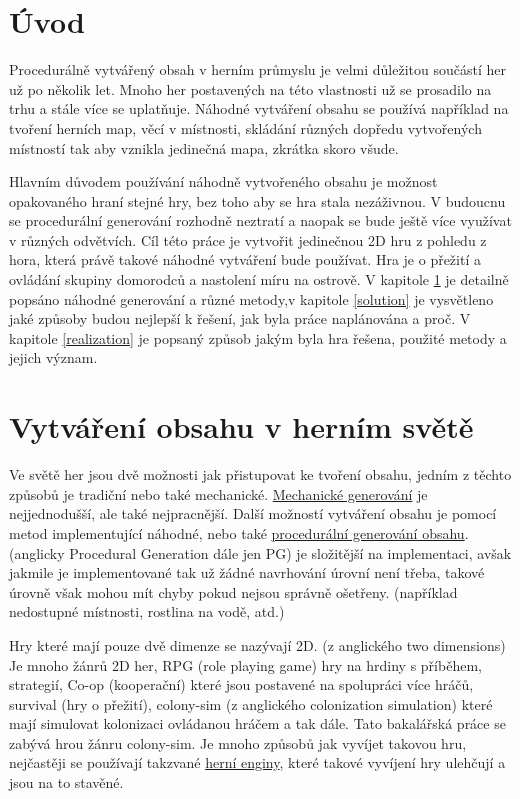 
\chapter*{Úvod}
Procedurálně vytvářený obsah v herním průmyslu je velmi důležitou součástí her už po několik let. Mnoho her postavených na této vlastnosti už se prosadilo na trhu a stále více se uplatňuje. Náhodné vytváření obsahu se používá například na tvoření herních map, věcí v místnosti, skládání různých dopředu vytvořených místností tak aby vznikla jedinečná mapa, zkrátka skoro všude. 

Hlavním důvodem používání náhodně vytvořeného obsahu je možnost opakovaného hraní stejné hry, bez toho aby se hra stala nezáživnou. V budoucnu se procedurální generování rozhodně neztratí a naopak se bude ještě více využívat v různých odvětvích. Cíl této práce je vytvořit jedinečnou 2D hru z pohledu z hora, která právě takové náhodné vytváření bude používat. Hra je o přežití a ovládání skupiny domorodců a nastolení míru na ostrově. V kapitole \ref{Teorie} je detailně popsáno náhodné generování a různé metody,v kapitole \ref{solution} je vysvětleno jaké způsoby budou nejlepší k řešení, jak byla práce naplánována a proč. V kapitole \ref{realization} je popsaný způsob jakým byla hra řešena, použité metody a jejich význam.

\chapter{Vytváření obsahu v herním světě} 
\label{Teorie}
Ve světě her jsou dvě možnosti jak přistupovat ke tvoření obsahu, jedním z těchto způsobů je tradiční nebo také mechanické. \hyperref[traditional]{Mechanické generování} je nejjednodušší, ale také nejpracnější. Další možností vytváření obsahu je pomocí metod implementující náhodné, nebo také \hyperref[procedural]{procedurální generování obsahu}. (anglicky Procedural Generation dále jen PG) je složitější na implementaci, avšak jakmile je implementované tak už žádné navrhování úrovní není třeba, takové úrovně však mohou mít chyby pokud nejsou správně ošetřeny. (například nedostupné místnosti, rostlina na vodě, atd.)

Hry které mají pouze dvě dimenze se nazývají 2D. (z anglického two dimensions) Je mnoho žánrů 2D her, RPG (role playing game) hry na hrdiny s příběhem, strategií, Co-op (kooperační) které jsou postavené na spolupráci více hráčů, survival (hry o přežití), colony-sim (z anglického colonization simulation) které mají simulovat kolonizaci ovládanou hráčem a tak dále. Tato bakalářská práce se zabývá hrou žánru colony-sim. Je mnoho způsobů jak vyvíjet takovou hru, nejčastěji se používají takzvané \hyperref[enginy]{herní enginy}, které takové vyvíjení hry ulehčují a jsou na to stavěné.


